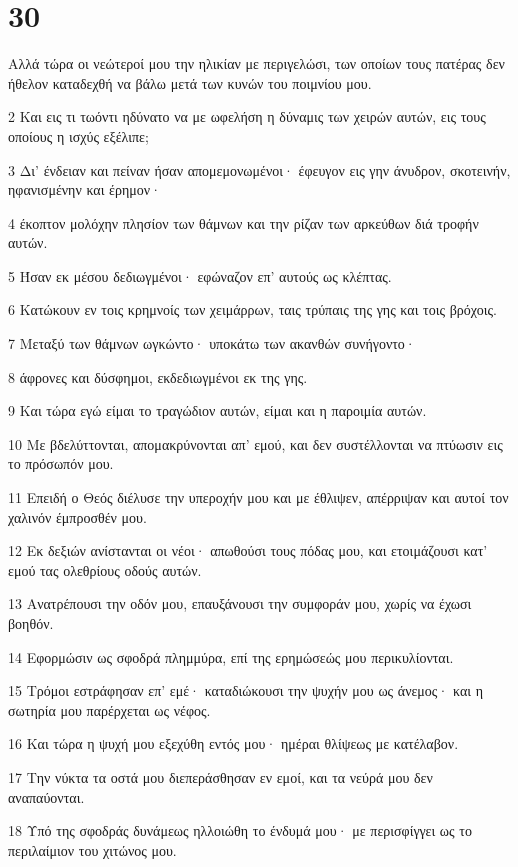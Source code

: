 \chapter{30}

\par Αλλά τώρα οι νεώτεροί μου την ηλικίαν με περιγελώσι, των οποίων τους πατέρας δεν ήθελον καταδεχθή να βάλω μετά των κυνών του ποιμνίου μου.
\par 2 Και εις τι τωόντι ηδύνατο να με ωφελήση η δύναμις των χειρών αυτών, εις τους οποίους η ισχύς εξέλιπε;
\par 3 Δι' ένδειαν και πείναν ήσαν απομεμονωμένοι· έφευγον εις γην άνυδρον, σκοτεινήν, ηφανισμένην και έρημον·
\par 4 έκοπτον μολόχην πλησίον των θάμνων και την ρίζαν των αρκεύθων διά τροφήν αυτών.
\par 5 Ήσαν εκ μέσου δεδιωγμένοι· εφώναζον επ' αυτούς ως κλέπτας.
\par 6 Κατώκουν εν τοις κρημνοίς των χειμάρρων, ταις τρύπαις της γης και τοις βρόχοις.
\par 7 Μεταξύ των θάμνων ωγκώντο· υποκάτω των ακανθών συνήγοντο·
\par 8 άφρονες και δύσφημοι, εκδεδιωγμένοι εκ της γης.
\par 9 Και τώρα εγώ είμαι το τραγώδιον αυτών, είμαι και η παροιμία αυτών.
\par 10 Με βδελύττονται, απομακρύνονται απ' εμού, και δεν συστέλλονται να πτύωσιν εις το πρόσωπόν μου.
\par 11 Επειδή ο Θεός διέλυσε την υπεροχήν μου και με έθλιψεν, απέρριψαν και αυτοί τον χαλινόν έμπροσθέν μου.
\par 12 Εκ δεξιών ανίστανται οι νέοι· απωθούσι τους πόδας μου, και ετοιμάζουσι κατ' εμού τας ολεθρίους οδούς αυτών.
\par 13 Ανατρέπουσι την οδόν μου, επαυξάνουσι την συμφοράν μου, χωρίς να έχωσι βοηθόν.
\par 14 Εφορμώσιν ως σφοδρά πλημμύρα, επί της ερημώσεώς μου περικυλίονται.
\par 15 Τρόμοι εστράφησαν επ' εμέ· καταδιώκουσι την ψυχήν μου ως άνεμος· και η σωτηρία μου παρέρχεται ως νέφος.
\par 16 Και τώρα η ψυχή μου εξεχύθη εντός μου· ημέραι θλίψεως με κατέλαβον.
\par 17 Την νύκτα τα οστά μου διεπεράσθησαν εν εμοί, και τα νεύρά μου δεν αναπαύονται.
\par 18 Υπό της σφοδράς δυνάμεως ηλλοιώθη το ένδυμά μου· με περισφίγγει ως το περιλαίμιον του χιτώνος μου.
